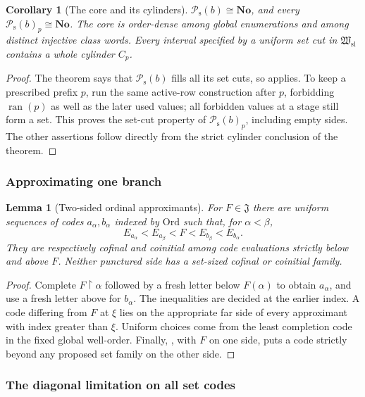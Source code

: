 \documentclass[11pt]{article}
\newtheorem{lemma}[lemma]{Lemma}
\newtheorem{corollary}[corollary]{Corollary}
\theoremstyle{definition}
\theoremstyle{remark}
\newcommand{\No}{\mathbf{No}}
\newcommand{\Ord}{\mathrm{Ord}}
\newcommand{\Hsl}{\mathfrak W_{\mathrm{sl}}}
\newcommand{\Jinj}{\mathfrak J}
\newcommand{\Psupp}{\mathcal P_{\mathrm{s}}}
\newcommand{\ran}{\operatorname{ran}}
\newcommand{\restr}{\mathbin{\upharpoonright}}
\begin{document}
\begin{corollary}[The core and its cylinders]\label{swo:fs:cor:core}
$\Psupp(b)\cong\No$, and every $\Psupp(b)_p\cong\No$. The core is order-dense
among global enumerations and among distinct injective class words.
Every interval specified by a uniform set cut in $\Hsl$ contains a
whole cylinder $C_p$.
\end{corollary}
\begin{proof}
The theorem says that $\Psupp(b)$ fills all its set cuts, so
 applies. To keep a prescribed prefix $p$,
run the same active-row construction after $p$, forbidding $\ran(p)$
as well as the later used values; all forbidden values at a stage
still form a set. This proves the set-cut property of $\Psupp(b)_p$,
including empty sides. The other assertions follow directly from the
strict cylinder conclusion of the theorem.
\end{proof}

\subsubsection{Approximating one branch}

\begin{lemma}[Two-sided ordinal approximants]\label{swo:fs:lem:approximants}
For $F\in \Jinj$ there are uniform sequences of codes $a_\alpha,b_\alpha$
indexed by $\Ord$ such that, for $\alpha<\beta$,
\[
 E_{a_\alpha}<E_{a_\beta}<F<E_{b_\beta}<E_{b_\alpha}.
\]
They are respectively cofinal and coinitial among code evaluations
strictly below and above $F$. Neither punctured side has a set-sized
cofinal or coinitial family.
\end{lemma}
\begin{proof}
Complete $F\restr\alpha$ followed by a fresh letter below $F(\alpha)$
to obtain $a_\alpha$, and use a fresh letter above for $b_\alpha$.
The inequalities are decided at the earlier index. A code differing
from $F$ at $\xi$ lies on the appropriate far side of every
approximant with index greater than $\xi$. Uniform choices come from
the least completion code in the fixed global well-order. Finally,
, with $F$ on one side, puts a code
strictly beyond any proposed set family on the other side.
\end{proof}

\subsubsection{The diagonal limitation on all set codes}
\end{document}
